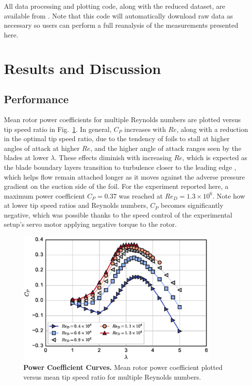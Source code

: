 \documentclass[10pt,letterpaper]{article}
\begin{document}
All data processing and plotting code, along with the reduced dataset, are
available from \cite{Bachant2016-RM2-data}. Note that this code will
automatically download raw data as necessary so users can perform a full
reanalysis of the measurements presented here.


\section*{Results and Discussion}

\subsection*{Performance}

Mean rotor power coefficients for multiple Reynolds numbers are plotted versus
tip speed ratio in Fig.~\ref{fig:cp-curves}. In general, $C_P$ increases with
$Re$, along with a reduction in the optimal tip speed ratio, due to the tendency
of foils to stall at higher angles of attack at higher $Re$, and the higher
angle of attack ranges seen by the blades at lower $\lambda$. These effects
diminish with increasing $Re$, which is expected as the blade boundary layers
transition to turbulence closer to the leading edge \cite{Lissaman1983,
    McMasters1980, Bachant2016-RVAT-Re-dep}, which helps flow remain attached longer
as it moves against the adverse pressure gradient on the suction side of the
foil. For the experiment reported here, a maximum power coefficient $C_P=0.37$
was reached at $Re_D=1.3 \times 10^6$. Note how at lower tip speed ratios and
Reynolds numbers, $C_P$ becomes significantly negative, which was possible
thanks to the speed control of the experimental setup's servo motor applying
negative torque to the rotor.

\begin{figure}
    \includegraphics[width=0.9\textwidth]{figures/cp_curves.eps}

    \caption{{\bf Power Coefficient Curves.} Mean rotor power coefficient
    plotted versus mean tip speed ratio for multiple Reynolds numbers.}

    \label{fig:cp-curves}
\end{figure}
\end{document}
